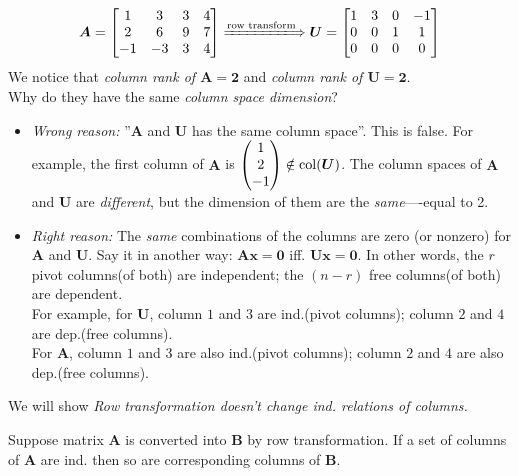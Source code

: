 \begin{example}
\qquad\\
\[
\bm A = \begin{bmatrix}
1&3&3&4\\2&6&9&7\\-1&-3&3&4
\end{bmatrix}
\xLongrightarrow{\text{row transform}}
\bm U = \begin{bmatrix}
1&3&0&-1\\0&0&1&1\\0&0&0&0
\end{bmatrix}
\]
We notice that \emph{column rank of $\bm A =\bm 2$} and \emph{column rank of $\bm U =\bm 2$}.\\
Why do they have the same \emph{column space dimension}?\\
\begin{itemize}
\item
\textit{Wrong reason: }''$\bm A$ and $\bm U$ has the same column space''. This is false. For example, the first column of $\bm A$ is $\begin{pmatrix}
1\\2\\-1
\end{pmatrix}\notin\operatorname{col}(\bm U)$. The column spaces of $\bm A$ and $\bm U$ are \emph{different}, but the dimension of them are the \emph{same}----equal to 2.
\item
\textit{Right reason: }The \emph{same} combinations of the columns are zero (or nonzero) for $\bm A$ and $\bm U$. Say it in another way: $\bm{Ax} = \bm 0$ iff. $\bm{Ux} = \bm 0$. In other words, the $r$ pivot columns(of both) are independent; the $(n-r)$ free columns(of both) are dependent. \\
For example, for $\bm U$, column $1$ and $3$ are ind.(pivot columns); column $2$ and $4$ are dep.(free columns).\\
For $\bm A$, column $1$ and $3$ are also ind.(pivot columns); column $2$ and $4$ are also dep.(free columns).
\end{itemize}
\end{example}
We will show \emph{Row transformation doesn't change ind. relations of columns.}
\begin{proposition}
Suppose matrix $\bm A$ is converted into $\bm B$ by row transformation. If a set of columns of $\bm A$ are ind. then so are corresponding columns of $\bm B$.
\end{proposition}
